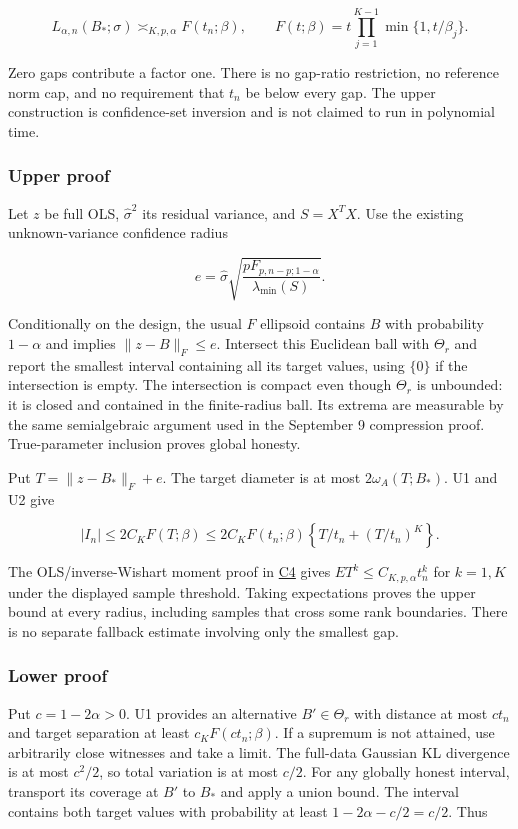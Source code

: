 \documentclass[
  11pt,
]{article}
\begin{document}
\[L_{\alpha,n}(B_*;\sigma)\asymp_{K,p,\alpha}
F(t_n;\beta),\qquad
F(t;\beta)=t\prod_{j=1}^{K-1}\min\{1,t/\beta_j\}.\tag{V1}\]

Zero gaps contribute a factor one. There is no gap-ratio restriction, no
reference norm cap, and no requirement that \(t_n\) be below every gap.
The upper construction is confidence-set inversion and is not claimed to
run in polynomial time.

\subsubsection{Upper proof}\label{upper-proof}

Let \(z\) be full OLS, \(\widehat\sigma^2\) its residual variance, and
\(S=X^TX\). Use the existing unknown-variance confidence radius

\[e=\widehat\sigma
\sqrt{\frac{p F_{p,n-p;1-\alpha}}{\lambda_{\min}(S)}}.\]

Conditionally on the design, the usual \(F\) ellipsoid contains \(B\)
with probability \(1-\alpha\) and implies \(\|z-B\|_F\le e\). Intersect
this Euclidean ball with \(\Theta_r\) and report the smallest interval
containing all its target values, using \(\{0\}\) if the intersection is
empty. The intersection is compact even though \(\Theta_r\) is
unbounded: it is closed and contained in the finite-radius ball. Its
extrema are measurable by the same semialgebraic argument used in the
September 9 compression proof. True-parameter inclusion proves global
honesty.

Put \(T=\|z-B_*\|_F+e\). The target diameter is at most
\(2\omega_A(T;B_*)\). U1 and U2 give

\[|I_n|\le2C_KF(T;\beta)
\le2C_KF(t_n;\beta)
\left\{T/t_n+(T/t_n)^K\right\}.\]

The OLS/inverse-Wishart moment proof in
\href{../../theory/certified_cross_inference.md}{C4} gives
\(E T^k\le C_{K,p,\alpha}t_n^k\) for \(k=1,K\) under the displayed
sample threshold. Taking expectations proves the upper bound at every
radius, including samples that cross some rank boundaries. There is no
separate fallback estimate involving only the smallest gap.

\subsubsection{Lower proof}\label{lower-proof}

Put \(c=1-2\alpha>0\). U1 provides an alternative \(B'\in\Theta_r\) with
distance at most \(ct_n\) and target separation at least
\(c_KF(ct_n;\beta)\). If a supremum is not attained, use arbitrarily
close witnesses and take a limit. The full-data Gaussian KL divergence
is at most \(c^2/2\), so total variation is at most \(c/2\). For any
globally honest interval, transport its coverage at \(B'\) to \(B_*\)
and apply a union bound. The interval contains both target values with
probability at least \(1-2\alpha-c/2=c/2\). Thus
\end{document}
